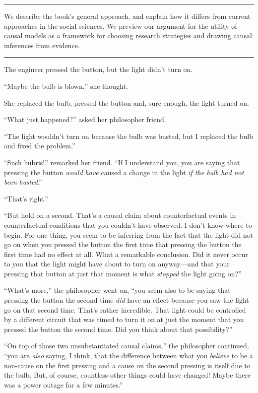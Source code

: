 \documentclass[12pt,]{book}
\begin{document}
\begin{center}\rule{0.5\linewidth}{\linethickness}\end{center}

We describe the book's general approach, and explain how it differs from current approaches in the social sciences. We preview our argument for the utility of causal models as a framework for choosing research strategies and drawing causal inferences from evidence.

\begin{center}\rule{0.5\linewidth}{\linethickness}\end{center}

The engineer pressed the button, but the light didn't turn on.

``Maybe the bulb is blown,'' she thought.

She replaced the bulb, pressed the button and, sure enough, the light turned on.

``What just happened?'' asked her philosopher friend.

``The light wouldn't turn on because the bulb was busted, but I replaced the bulb and fixed the problem.''

``Such hubris!'' remarked her friend. ``If I understand you, you are saying that pressing the button \emph{would have} caused a change in the light \emph{if the bulb had not been busted}.''

``That's right.''

``But hold on a second. That's a causal claim about counterfactual events in counterfactual conditions that you couldn't have observed. I don't know where to begin. For one thing, you seem to be inferring from the fact that the light did not go on when you pressed the button the first time that pressing the button the first time had no effect at all. What a remarkable conclusion. Did it never occur to you that the light might have about to turn on anyway---and that your pressing that button at just that moment is what \emph{stopped} the light going on?''

``What's more,'' the philosopher went on, ``you seem also to be saying that pressing the button the second time \emph{did} have an effect because you saw the light go on that second time. That's rather incredible. That light could be controlled by a different circuit that was timed to turn it on at just the moment that you pressed the button the second time. Did you think about that possibility?''

``On top of those two unsubstantiated causal claims,'' the philosopher continued, ``you are \emph{also} saying, I think, that the difference between what you \emph{believe} to be a non-cause on the first pressing and a cause on the second pressing is itself due to the bulb. But, of course, countless other things could have changed! Maybe there was a power outage for a few minutes.''
\end{document}
